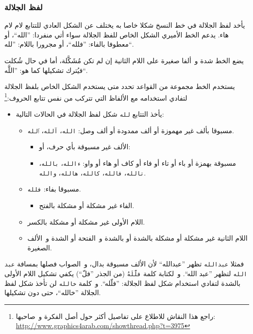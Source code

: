 \documentclass{article}
\begin{document}
\subsubsection{لفظ الجلالة}
يأخد لفظ الجلالة في خط النسخ شكلا خاصا به يختلف عن الشكل العادي للتتابع
لام لام هاء. يدعم الخط الأميري الشكل الخاص للفظ الجلالة سواء أتي منفردا:
”الله“، أو معطوفا بالفاء: ”فلله“، أو مجرورا باللام: ”لله“.

يضع الخط شدة و ألفا صغيرة على اللام الثانية إن لم تكن مُشَكَّلة، أما في
حال شُكلت فيُترك تشكيلها كما هو: ”اللَّه“.

يستخدم الخط مجموعة من القواعد تحدد متى يستخدم الشكل الخاص بلفظ الجلالة
لتفادي استخدامه مع الألفاظ التي تتركب من نفس تتابع الحروف:\footnote{راجع
هذا النقاش للاطلاع على تفاصيل أكثر حول أصل الفكرة و صاحبها:
\url{http://www.graphics4arab.com/showthread.php?t=3975}}

\begin{itemize}
\item
  يأخذ التتابع \texttt{لله} شكل لفظ الجلالة في الحالات التالية:
  \begin{itemize}
  \item
    مسبوقا بألف غير مهموزة أو ألف ممدودة أو ألف وصل: \texttt{الله}،
    \texttt{آلله}، \texttt{ٱلله}.
    \begin{itemize}
    \item
      الألف غير مسبوقة بأي حرف، أو:
    \item
      مسبوقة بهمزة أو باء أو تاء أو فاء أو كاف أو هاء أو واو:
      \texttt{ءالله}، \texttt{بالله}، \texttt{تالله}، \texttt{فالله}،
      \texttt{كالله}، \texttt{هالله}، \texttt{والله}.
    \end{itemize}
  \item
    مسبوقا بفاء: \texttt{فلله}.
    \begin{itemize}
    \item
      الفاء غير مشكلة أو مشكلة بالفتح.
    \end{itemize}
  \item
    اللام الأولى غير مشكلة أو مشكلة بالكسر.
  \item
    اللام الثانية غير مشكلة أو مشكلة بالشدة أو بالشدة و الفتحة أو الشدة
    و الألف الصغيرة.
  \end{itemize}
\end{itemize}

فمثلا \texttt{عبدالله} تظهر ”عبدالله“ لأن الألف مسبوقة بدال، و الصواب
فصلها بمسافة \texttt{عبد الله} لتظهر ”عبد الله“. و لكتابة كلمة
\texttt{فلَّلَهُ} (من الجذر ”فلّ“) يكفي تشكيل اللام الأولى بالشدة
لتفادي استخدام شكل لفظ الجلالة: ”فلّله“. و كلمة \texttt{خالله} لن تأخذ
شكل لفظ الجلالة ”خالله“، حتى دون تشكيلها.
\end{document}
